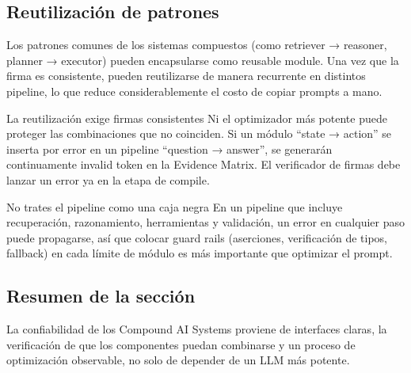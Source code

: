 \subsection{Reutilización de patrones}

Los patrones comunes de los sistemas compuestos (como retriever → reasoner, planner → executor) pueden encapsularse como reusable module. Una vez que la firma es consistente, pueden reutilizarse de manera recurrente en distintos pipeline, lo que reduce considerablemente el costo de copiar prompts a mano.

\begin{knowledgebox}{La reutilización exige firmas consistentes}
Ni el optimizador más potente puede proteger las combinaciones que no coinciden. Si un módulo ``state → action'' se inserta por error en un pipeline ``question → answer'', se generarán continuamente invalid token en la Evidence Matrix. El verificador de firmas debe lanzar un error ya en la etapa de compile.
\end{knowledgebox}

\begin{warningbox}{No trates el pipeline como una caja negra}
En un pipeline que incluye recuperación, razonamiento, herramientas y validación, un error en cualquier paso puede propagarse, así que colocar guard rails (aserciones, verificación de tipos, fallback) en cada límite de módulo es más importante que optimizar el prompt.
\end{warningbox}

\subsection{Resumen de la sección}

La confiabilidad de los Compound AI Systems proviene de interfaces claras, la verificación de que los componentes puedan combinarse y un proceso de optimización observable, no solo de depender de un LLM más potente.
